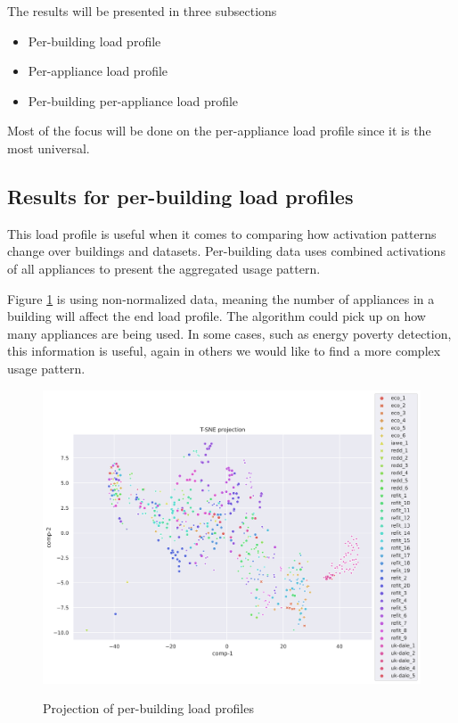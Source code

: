 The results will be presented in three subsections

\begin{itemize}
	\item Per-building load profile
	\item Per-appliance load profile
	\item Per-building per-appliance load profile
\end{itemize}

Most of the focus will be done on the per-appliance load profile since it is the most universal.

\subsection{Results for per-building load profiles}
\label{ssec:res_pb_lp}
This load profile is useful when it comes to comparing how 
activation patterns change over buildings and datasets.
Per-building data uses combined activations of all appliances to present 
the aggregated usage pattern. 

Figure \ref{fig:tsne_scatter_non_norm_all} is using non-normalized data, meaning
the number of appliances in a building will affect the end load profile.
The algorithm could pick up on how many appliances are being used.
In some cases, such as energy poverty detection, this information is useful, 
again in others we would like to find a more complex usage pattern.

\begin{figure}[H]
	\centering
	\caption{Projection of per-building load profiles}
	\includegraphics[width=1.2\textwidth]{Figures/TSNE/TSNE_per_building/non_norm/scatter_non_norm_all.png}
	\label{fig:tsne_scatter_non_norm_all}
\end{figure}

